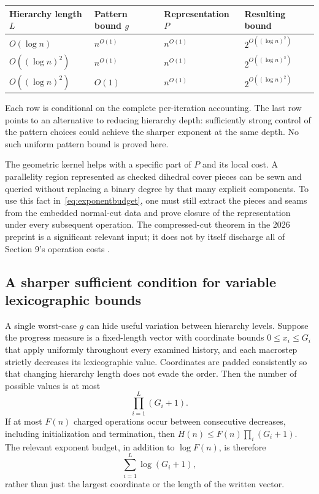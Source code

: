 \documentclass[11pt,a4paper]{article}
\theoremstyle{definition}\newtheorem{definition}[theorem]{Definition}
\theoremstyle{remark}\newtheorem{remark}[theorem]{Remark}
\begin{document}
\begin{center}
\begin{tabular}{llll}
\toprule
Hierarchy length $L$ & Pattern bound $g$ & Representation $P$ & Resulting bound\\
\midrule
$O(\log n)$ & $n^{O(1)}$ & $n^{O(1)}$ & $2^{O((\log n)^2)}$\\
$O((\log n)^2)$ & $n^{O(1)}$ & $n^{O(1)}$ & $2^{O((\log n)^3)}$\\
$O((\log n)^2)$ & $O(1)$ & $n^{O(1)}$ & $2^{O((\log n)^2)}$\\
\bottomrule
\end{tabular}
\end{center}
Each row is conditional on the complete per-iteration accounting. The last
row points to an alternative to reducing hierarchy depth: sufficiently
strong control of the pattern choices could achieve the sharper exponent
at the same depth. No such uniform pattern bound is proved here.

The geometric kernel helps with a specific part of $P$ and its local cost.
A parallelity region represented as checked dihedral cover pieces can be
sewn and queried without replacing a binary degree by that many explicit
components. To use this fact in~\eqref{eq:exponentbudget}, one must still
extract the pieces and seams from the embedded normal-cut data and prove
closure of the representation under every subsequent operation. The
compressed-cut theorem in the 2026 preprint is a significant relevant
input; it does not by itself discharge all of Section 9's operation costs
\cite{lackenby-hierarchy}.

\subsection{A sharper sufficient condition for variable lexicographic bounds}

A single worst-case $g$ can hide useful variation between hierarchy levels.
Suppose the progress measure is a fixed-length vector with coordinate
bounds $0\le x_i\le G_i$ that apply uniformly throughout every examined
history, and each macrostep strictly decreases its lexicographic value.
Coordinates are padded consistently so that
changing hierarchy length does not evade the order. Then the number of
possible values is at most
\[
 \prod_{i=1}^{L}(G_i+1).
\]
If at most $F(n)$ charged operations occur between consecutive decreases,
including initialization and termination, then
$H(n)\le F(n)\prod_i(G_i+1)$. The relevant exponent budget, in addition to
$\log F(n)$, is therefore
\begin{equation}\label{eq:weightedbudget}
 \sum_{i=1}^{L}\log(G_i+1),
\end{equation}
rather than just the largest coordinate or the length of the written
vector.
\end{document}
